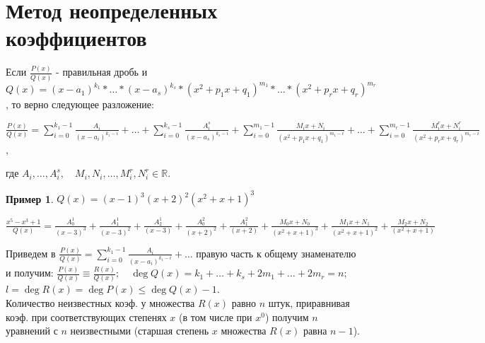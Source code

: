 \documentclass{report}
\theoremstyle{definition}
\newtheorem*{example}{Пример}
\begin{document}
\section{Метод неопределенных коэффициентов}

Если $\frac{P(x)}{Q(x)}$ - правильная дробь и $Q(x) = (x-a_{1})^{k_{1}} * \ldots * (x - a_{s})^{k_{s}} * (x^{2} + p_{1}x +
    q_{1})^{m_{1}} * \ldots * (x^{2} + p_{r}x + q_{r})^{m_{r}}$, то верно следующее разложение:

\begin{center}
    {\Large $\frac{P(x)}{Q(x)} = \sum_{i = 0}^{k_{1}-1} \frac{A_{i}}{(x - a_{i})^{k_{1} - i}} + \ldots + \sum_{i = 0}^{k_{s} - 1}
            \frac{A^{s}_{i}}{(x - a_{s})^{k_{s} - i}} + \sum_{i = 0}^{m_{1} - 1} \frac{M_{i}x + N_{i}}{(x^{2} + p_{1}x + q_{1})
                ^{m_{1} - i}} + \ldots + \sum_{i = 0}^{m_{r} - 1} \frac{M_{i}^{r}x + N_{i}^{r}}{(x^{2} + p_{r}x + q_{r})^{m_{r} - i}}$, \\}
\end{center}

где $A_{i}, \ldots, A_{i}^{s}, \quad M_{i}, N_{i}, \ldots, M_{i}^{r}, N_{i}^{r} \in \mathbb{R}$.

\begin{example}
    $Q(x) = (x-1)^{3}(x+2)^{2}(x^{2} + x + 1)^{3}$
    \begin{center}
        {\Large $\frac{x^{5} - x^{3} + 1}{Q(x)} = \frac{A^{1}_{0}}{(x - 3)^{3}} + \frac{A^{1}_{1}}{(x - 3)^{2}} +
                \frac{A^{1}_{2}}{(x - 3)} + \frac{A^{2}_{0}}{(x + 2)^{2}} + \frac{A^{2}_{1}}{(x + 2)} + \frac{M_{0}x + N_{0}}
                {(x^{2} + x + 1)^{3}} + \frac{M_{1}x + N_{1}}{(x^{2} + x + 1)^{2}} + \frac{M_{2}x + N_{2}}{(x^{2} + x + 1)}$}
    \end{center}
\end{example}

Приведем в $\frac{P(x)}{Q(x)} = \sum_{i = 0}^{k_{1}-1} \frac{A_{i}}{(x - a_{i})^{k_{1} - i}} + \ldots$
правую часть к общему знаменателю и получим: $\frac{P(x)}{Q(x)} \equiv \frac{R(x)}{Q(x)}; \quad \deg Q(x) =
    k_{1} + \ldots + k_{s} + 2m_{1} + \ldots + 2m_{r} = n$; \\

$l = \deg R(x) = \deg P(x) \leqslant \deg Q(x) - 1$. \\

Количество неизвестных коэф. у множества $R(x)$ равно $n$ штук, приравнивая коэф. при соответствующих степенях
$x$ (в том числе при $x^{0}$) получим $n$ уравнений с $n$ неизвестными (старшая степень $x$ множества $R(x)$ равна $n-1$).
\end{document}
